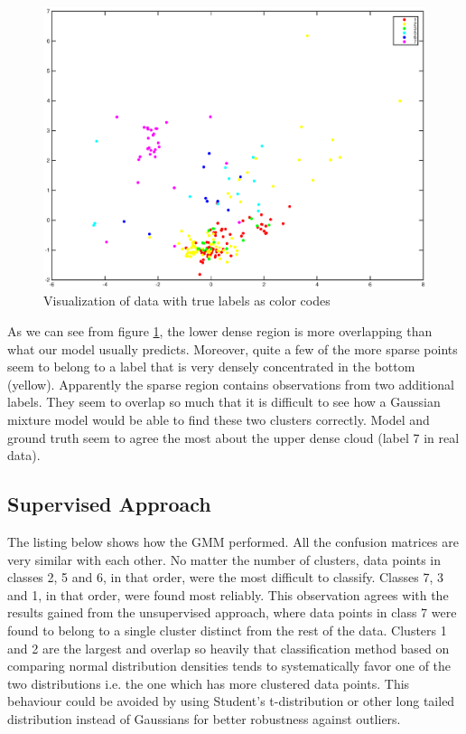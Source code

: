 \documentclass[a4paper]{article}
\begin{document}
\begin{figure}[H]
	\includegraphics[trim={3.5cm 1.5cm 3cm 1.3cm},clip,scale=0.45]{MDS_true_labels.eps}
	\caption{Visualization of data with true labels as color codes}
	\label{true_labels}
\end{figure}

As we can see from figure \ref{true_labels}, the lower dense region is more overlapping than what our model usually predicts. Moreover,  quite a few of the more sparse points seem to belong to a label that is very densely concentrated in the bottom (yellow). Apparently the sparse region contains observations from two additional labels. They seem to overlap so much that it is difficult to see how a Gaussian mixture model would be able to find these two clusters correctly. Model and ground truth seem to agree the most about the upper dense cloud (label 7 in real data). 

\subsection{Supervised Approach}

The listing below shows how the GMM performed.
All the confusion matrices are very similar with each other. No matter the
number of clusters, data points in classes 2, 5 and 6, in that order, were the
most difficult to classify. Classes 7, 3 and 1, in that order, were found most
reliably. This observation agrees with the results gained from the unsupervised
approach, where data points in class 7 were found to belong to a single cluster
distinct from the rest of the data. Clusters 1 and 2 are the largest and
overlap so heavily that classification method based on comparing normal
distribution densities tends to systematically favor one of the two
distributions i.e. the one which has more clustered data points. This behaviour
could be avoided by using Student's t-distribution or other long tailed
distribution instead of Gaussians for better robustness against outliers.
\end{document}
